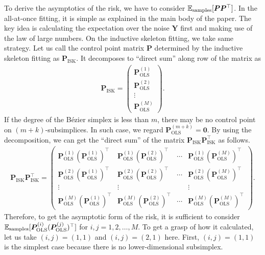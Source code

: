 \documentclass{article}
\begin{document}
To derive the asymptotics of the risk, we have to consider $\mathbb{E}_\text{samples} [ \bm P \bm P^\top ]$.
In the all-at-once fitting, it is simple as explained in the main body of the paper.
The key idea is calculating the expectation over the noise $\bm Y$ first and making use of the law of large numbers.
On the inductive skeleton fitting, we take same strategy.
%
Let us call the control point matrix $\bm P$ determined by the inductive skeleton fitting as $\bm P_\text{ISK}$.
It decomposes to ``direct sum'' along row of the matrix as
\begin{align}
\bm P_\text{ISK}
=
\begin{pmatrix}
{\bm P}^{(1)}_\mathrm{OLS}
\\
{\bm P}^{(2) }_\mathrm{OLS}
\\
\vdots
\\
{\bm P}^{(M)}_\mathrm{OLS}
\end{pmatrix}
.
\end{align}
If the degree of the B\'ezier simplex is less than $m$, there may be no control point on $(m+k)$-subsimplices.
In such case, we regard $\bm P_\mathrm{OLS}^{(m+k)} = \bm 0$.
By using the decomposition, we can get the ``direct sum'' of the matrix $\bm P_\text{ISK} \bm P_\text{ISK}^\top$ as follows.
\begin{align}
\bm P_\text{ISK} \bm P_\text{ISK}^\top
=
\begin{pmatrix}
{\bm P}^{(1)}_\mathrm{OLS}
({\bm P}^{(1)}_\mathrm{OLS})^\top
&
{\bm P}^{(1)}_\mathrm{OLS}
({\bm P}^{(2)}_\mathrm{OLS})^\top
&
\cdots
&
{\bm P}^{(1)}_\mathrm{OLS}
({\bm P}^{(M)}_\mathrm{OLS})^\top
\\
{\bm P}^{(2)}_\mathrm{OLS}
({\bm P}^{(1)}_\mathrm{OLS})^\top
&
{\bm P}^{(2)}_\mathrm{OLS}
({\bm P}^{(2)}_\mathrm{OLS})^\top
&
\cdots
&
{\bm P}^{(2)}_\mathrm{OLS}
({\bm P}^{(M)}_\mathrm{OLS})^\top
\\
\vdots & \vdots & \ & \vdots
\\
{\bm P}^{(M)}_\mathrm{OLS}
({\bm P}^{(1)}_\mathrm{OLS})^\top
&
{\bm P}^{(M)}_\mathrm{OLS}
({\bm P}^{(2)}_\mathrm{OLS})^\top
&
\cdots
&
{\bm P}^{(M)}_\mathrm{OLS}
({\bm P}^{(M)}_\mathrm{OLS})^\top
\end{pmatrix}
.
\end{align}
Therefore, to get the asymptotic form of the risk, it is sufficient to consider $\mathbb{E}_\text{samples}[{\bm P}^{(i)}_\mathrm{OLS}
({\bm P}^{(j)}_\mathrm{OLS})^\top]$ for $i, j = 1, 2, \dots, M$.
To get a grasp of how it calculated, let us take $(i,j) = (1,1)$ and $(i, j) =  (2, 1)$ here.
First, $(i,j) = (1,1)$ is the simplest case because there is no lower-dimensional subsimplex.
\end{document}

